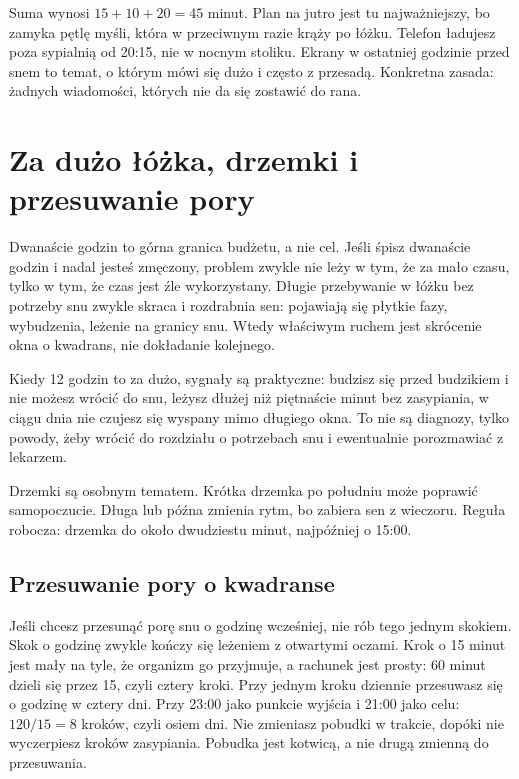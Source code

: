 Suma wynosi $15 + 10 + 20 = 45$ minut. Plan na jutro jest tu najważniejszy, bo zamyka pętlę myśli, która w przeciwnym razie krąży po łóżku. Telefon ładujesz poza sypialnią od 20:15, nie w nocnym stoliku. Ekrany w ostatniej godzinie przed snem to temat, o którym mówi się dużo i często z przesadą. Konkretna zasada: żadnych wiadomości, których nie da się zostawić do rana. 

\section{Za dużo łóżka, drzemki i przesuwanie pory}

Dwanaście godzin to górna granica budżetu, a nie cel. Jeśli śpisz dwanaście godzin i nadal jesteś zmęczony, problem zwykle nie leży w tym, że za mało czasu, tylko w tym, że czas jest źle wykorzystany. Długie przebywanie w łóżku bez potrzeby snu zwykle skraca i rozdrabnia sen: pojawiają się płytkie fazy, wybudzenia, leżenie na granicy snu.  Wtedy właściwym ruchem jest skrócenie okna o kwadrans, nie dokładanie kolejnego.

Kiedy 12 godzin to za dużo, sygnały są praktyczne: budzisz się przed budzikiem i nie możesz wrócić do snu, leżysz dłużej niż piętnaście minut bez zasypiania, w ciągu dnia nie czujesz się wyspany mimo długiego okna. To nie są diagnozy, tylko powody, żeby wrócić do rozdziału o potrzebach snu i ewentualnie porozmawiać z lekarzem.

Drzemki są osobnym tematem. Krótka drzemka po południu może poprawić samopoczucie. Długa lub późna zmienia rytm, bo zabiera sen z wieczoru. Reguła robocza: drzemka do około dwudziestu minut, najpóźniej o 15:00. 

\subsection{Przesuwanie pory o kwadranse}

Jeśli chcesz przesunąć porę snu o godzinę wcześniej, nie rób tego jednym skokiem. Skok o godzinę zwykle kończy się leżeniem z otwartymi oczami. Krok o 15 minut jest mały na tyle, że organizm go przyjmuje, a rachunek jest prosty: 60 minut dzieli się przez 15, czyli cztery kroki. Przy jednym kroku dziennie przesuwasz się o godzinę w cztery dni. Przy 23:00 jako punkcie wyjścia i 21:00 jako celu: $120 / 15 = 8$ kroków, czyli osiem dni. Nie zmieniasz pobudki w trakcie, dopóki nie wyczerpiesz kroków zasypiania. Pobudka jest kotwicą, a nie drugą zmienną do przesuwania.

